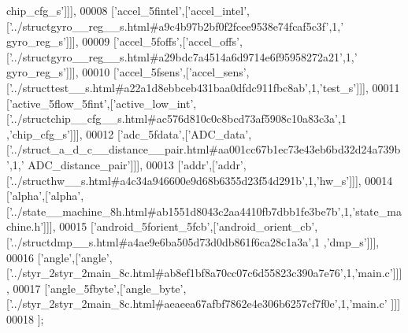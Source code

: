 \begin{DoxyCode}
{      chip\_cfg\_s'}]]],
00008   [\textcolor{stringliteral}{'accel\_5fintel'},[\textcolor{stringliteral}{'accel\_intel'},[\textcolor{stringliteral}{'../structgyro\_\_reg\_\_s.html#a9c4b97b2bf0f2fcee9538e74fcaf5c3f'},1,\textcolor{stringliteral}{'
      gyro\_reg\_s'}]]],
00009   [\textcolor{stringliteral}{'accel\_5foffs'},[\textcolor{stringliteral}{'accel\_offs'},[\textcolor{stringliteral}{'../structgyro\_\_reg\_\_s.html#a29bdc7a4514a6d9714e6f95958272a21'},1,\textcolor{stringliteral}{'
      gyro\_reg\_s'}]]],
00010   [\textcolor{stringliteral}{'accel\_5fsens'},[\textcolor{stringliteral}{'accel\_sens'},[\textcolor{stringliteral}{'../structtest\_\_s.html#a22a1d8ebbceb431baa0dfdc911fbc8ab'},1,\textcolor{stringliteral}{'test\_s'}]]],
00011   [\textcolor{stringliteral}{'active\_5flow\_5fint'},[\textcolor{stringliteral}{'active\_low\_int'},[\textcolor{stringliteral}{'../structchip\_\_cfg\_\_s.html#ac576d810c0c8bcd73af5908c10a83c3a'},1
      ,\textcolor{stringliteral}{'chip\_cfg\_s'}]]],
00012   [\textcolor{stringliteral}{'adc\_5fdata'},[\textcolor{stringliteral}{'ADC\_data'},[\textcolor{stringliteral}{'../struct\_a\_d\_c\_\_distance\_\_pair.html#aa001cc67b1ec73e43eb6bd32d24a739b'},1,\textcolor{stringliteral}{'
      ADC\_distance\_pair'}]]],
00013   [\textcolor{stringliteral}{'addr'},[\textcolor{stringliteral}{'addr'},[\textcolor{stringliteral}{'../structhw\_\_s.html#a4c34a946600e9d68b6355d23f54d291b'},1,\textcolor{stringliteral}{'hw\_s'}]]],
00014   [\textcolor{stringliteral}{'alpha'},[\textcolor{stringliteral}{'alpha'},[\textcolor{stringliteral}{'../state\_\_machine\_8h.html#ab1551d8043c2aa4410fb7dbb1fe3be7b'},1,\textcolor{stringliteral}{'state\_machine.h'}]]],
00015   [\textcolor{stringliteral}{'android\_5forient\_5fcb'},[\textcolor{stringliteral}{'android\_orient\_cb'},[\textcolor{stringliteral}{'../structdmp\_\_s.html#a4ae9e6ba505d73d0db861f6ca28c1a3a'},1
      ,\textcolor{stringliteral}{'dmp\_s'}]]],
00016   [\textcolor{stringliteral}{'angle'},[\textcolor{stringliteral}{'angle'},[\textcolor{stringliteral}{'../styr\_2styr\_2main\_8c.html#ab8ef1bf8a70cc07c6d55823c390a7e76'},1,\textcolor{stringliteral}{'main.c'}]]],
00017   [\textcolor{stringliteral}{'angle\_5fbyte'},[\textcolor{stringliteral}{'angle\_byte'},[\textcolor{stringliteral}{'../styr\_2styr\_2main\_8c.html#aeaeea67afbf7862e4e306b6257cf7f0e'},1,\textcolor{stringliteral}{'main.c'}
      ]]]
00018 ];
\end{DoxyCode}
